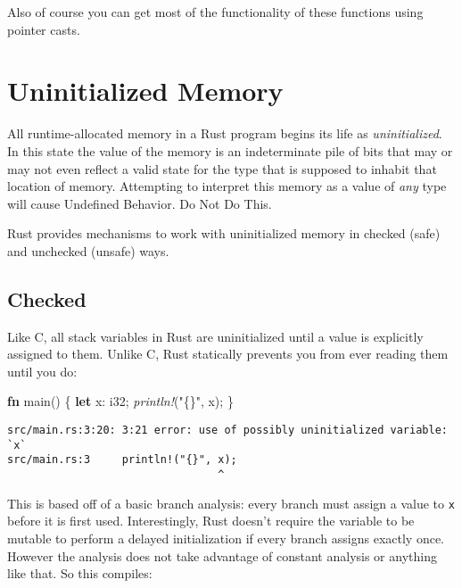 \documentclass[a4paper,]{book}
\renewcommand*{\hypertarget}[3][\ar]{%
  \def\ar{#2}%
  \label{#1}%
  #3}
\newenvironment{Shaded}{\begin{snugshade}}{\end{snugshade}}
\newcommand{\KeywordTok}[1]{\textcolor[rgb]{0.13,0.29,0.53}{\textbf{{#1}}}}
\newcommand{\DataTypeTok}[1]{\textcolor[rgb]{0.13,0.29,0.53}{{#1}}}
\newcommand{\StringTok}[1]{\textcolor[rgb]{0.31,0.60,0.02}{{#1}}}
\newcommand{\PreprocessorTok}[1]{\textcolor[rgb]{0.56,0.35,0.01}{\textit{{#1}}}}
\newcommand{\NormalTok}[1]{{#1}}
\begin{document}
Also of course you can get most of the functionality of these functions
using pointer casts.

\hypertarget{sec--uninitialized}{\chapter{Uninitialized
Memory}\label{sec--uninitialized}}

All runtime-allocated memory in a Rust program begins its life as
\emph{uninitialized}. In this state the value of the memory is an
indeterminate pile of bits that may or may not even reflect a valid
state for the type that is supposed to inhabit that location of memory.
Attempting to interpret this memory as a value of \emph{any} type will
cause Undefined Behavior. Do Not Do This.

Rust provides mechanisms to work with uninitialized memory in checked
(safe) and unchecked (unsafe) ways.

\section{Checked}\label{sec--checked-uninit}

Like C, all stack variables in Rust are uninitialized until a value is
explicitly assigned to them. Unlike C, Rust statically prevents you from
ever reading them until you do:

\begin{Shaded}
\begin{Highlighting}[]
\KeywordTok{fn} \NormalTok{main() \{}
    \KeywordTok{let} \NormalTok{x: }\DataTypeTok{i32}\NormalTok{;}
    \PreprocessorTok{println!}\NormalTok{(}\StringTok{"\{\}"}\NormalTok{, x);}
\NormalTok{\}}
\end{Highlighting}
\end{Shaded}

\begin{verbatim}
src/main.rs:3:20: 3:21 error: use of possibly uninitialized variable: `x`
src/main.rs:3     println!("{}", x);
                                 ^
\end{verbatim}

This is based off of a basic branch analysis: every branch must assign a
value to \texttt{x} before it is first used. Interestingly, Rust doesn't
require the variable to be mutable to perform a delayed initialization
if every branch assigns exactly once. However the analysis does not take
advantage of constant analysis or anything like that. So this compiles:
\end{document}
